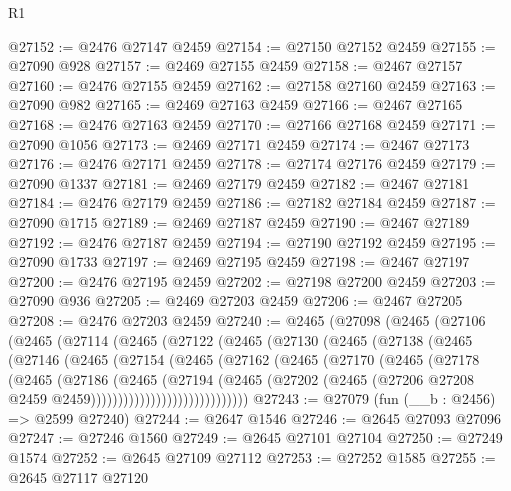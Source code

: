 \begin{lexlean}{R1}
\begin{coremodule}
@27152 := @2476 @27147 @2459
@27154 := @27150 @27152 @2459
@27155 := @27090 @928
@27157 := @2469 @27155 @2459
@27158 := @2467 @27157
@27160 := @2476 @27155 @2459
@27162 := @27158 @27160 @2459
@27163 := @27090 @982
@27165 := @2469 @27163 @2459
@27166 := @2467 @27165
@27168 := @2476 @27163 @2459
@27170 := @27166 @27168 @2459
@27171 := @27090 @1056
@27173 := @2469 @27171 @2459
@27174 := @2467 @27173
@27176 := @2476 @27171 @2459
@27178 := @27174 @27176 @2459
@27179 := @27090 @1337
@27181 := @2469 @27179 @2459
@27182 := @2467 @27181
@27184 := @2476 @27179 @2459
@27186 := @27182 @27184 @2459
@27187 := @27090 @1715
@27189 := @2469 @27187 @2459
@27190 := @2467 @27189
@27192 := @2476 @27187 @2459
@27194 := @27190 @27192 @2459
@27195 := @27090 @1733
@27197 := @2469 @27195 @2459
@27198 := @2467 @27197
@27200 := @2476 @27195 @2459
@27202 := @27198 @27200 @2459
@27203 := @27090 @936
@27205 := @2469 @27203 @2459
@27206 := @2467 @27205
@27208 := @2476 @27203 @2459
@27240 := @2465
    (@27098
      (@2465
        (@27106
          (@2465
            (@27114
              (@2465
                (@27122
                  (@2465
                    (@27130
                      (@2465
                        (@27138
                          (@2465
                            (@27146
                              (@2465
                                (@27154
                                  (@2465
                                    (@27162
                                      (@2465
                                        (@27170
                                          (@2465
                                            (@27178
                                              (@2465
                                                (@27186
                                                  (@2465
                                                    (@27194
                                                      (@2465
                                                        (@27202
                                                          (@2465
                                                            (@27206
                                                              @27208
                                                              @2459
                                                              @2459)))))))))))))))))))))))))))))
@27243 := @27079 (fun (__b : @2456) => @2599 @27240)
@27244 := @2647 @1546
@27246 := @2645 @27093 @27096
@27247 := @27246 @1560
@27249 := @2645 @27101 @27104
@27250 := @27249 @1574
@27252 := @2645 @27109 @27112
@27253 := @27252 @1585
@27255 := @2645 @27117 @27120

\end{coremodule}
\end{lexlean}
